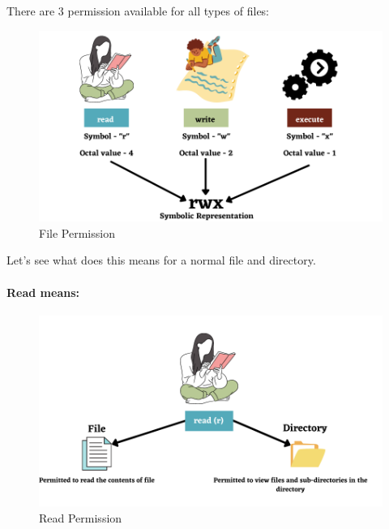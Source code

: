 \setlength{\columnsep}{3pt}
\begin{flushleft}
	There are 3 permission available for all types of files:
	\begin{figure}[h!]
		\centering
		\includegraphics[scale=0.5]{content/chapter5/images/perm2.png}
		\bigskip
		\caption{File Permission}
		\label{fig:file_permission}
	\end{figure}

	Let's see what does this means for a normal file and directory.
	\newpage
	\paragraph{Read means:}
	\begin{figure}[h!]
		\centering
		\includegraphics[scale=0.4]{content/chapter5/images/8.png}
		\caption{Read Permission}
		\label{fig:read_permission}
	\end{figure}


\end{flushleft}
